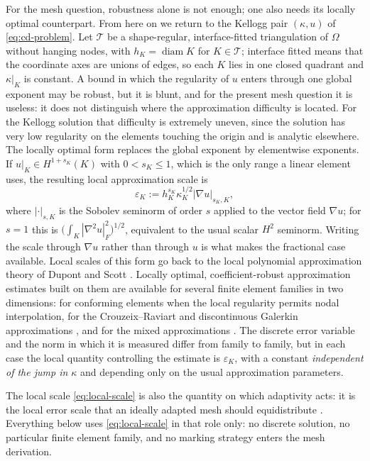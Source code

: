 \documentclass[10pt,pdftex]{amsart}%
\numberwithin{equation}{section}
\newcommand{\Tcal}{\mathcal{T}}
\begin{document}
For the mesh question, robustness alone is not enough; one also needs its locally optimal counterpart.  From here on we return to the Kellogg pair $(\kappa,u)$ of \eqref{eq:cd-problem}.  Let $\Tcal$ be a shape-regular, interface-fitted triangulation of $\Omega$ without hanging nodes, with $h_K=\operatorname{diam}K$ for $K\in\Tcal$; interface fitted means that the coordinate axes are unions of edges, so each $K$ lies in one closed quadrant and $\kappa|_K$ is constant.  A bound in which the regularity of $u$ enters through one global exponent may be robust, but it is blunt, and for the present mesh question it is useless: it does not distinguish where the approximation difficulty is located.  For the Kellogg solution that difficulty is extremely uneven, since the solution has very low regularity on the elements touching the origin and is analytic elsewhere.  The locally optimal form replaces the global exponent by elementwise exponents.  If $u|_K\in H^{1+s_K}(K)$ with $0<s_K\le1$, which is the only range a linear element uses, the resulting local approximation scale is
\begin{equation}\label{eq:local-scale}
  \varepsilon_K
  :=h_K^{s_K}\kappa_K^{1/2}|\nabla u|_{s_K,K},
\end{equation}
where $|\cdot|_{s,K}$ is the Sobolev seminorm of order $s$ applied to the vector field $\nabla u$; for $s=1$ this is $\bigl(\int_K|\nabla^2u|_F^2\bigr)^{1/2}$, equivalent to the usual scalar $H^2$ seminorm.  Writing the scale through $\nabla u$ rather than through $u$ is what makes the fractional case available.  Local scales of this form go back to the local polynomial approximation theory of Dupont and Scott \cite{DupontScott}.  Locally optimal, coefficient-robust approximation estimates built on them are available for several finite element families in two dimensions: for conforming elements when the local regularity permits nodal interpolation, for the Crouzeix--Raviart and discontinuous Galerkin approximations \cite{CHZ17}, and for the mixed approximations \cite{Z20}.  The discrete error variable and the norm in which it is measured differ from family to family, but in each case the local quantity controlling the estimate is $\varepsilon_K$, with a constant \emph{independent of the jump in $\kappa$} and depending only on the usual approximation parameters.

The local scale \eqref{eq:local-scale} is also the quantity on which adaptivity acts: it is the local error scale that an ideally adapted mesh should equidistribute \cite{CHZ17,NV2012}.  Everything below uses \eqref{eq:local-scale} in that role only: no discrete solution, no particular finite element family, and no marking strategy enters the mesh derivation.
\end{document}
